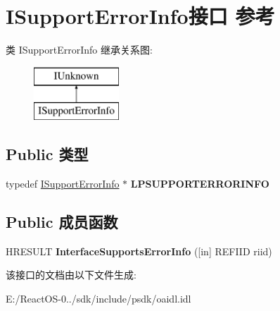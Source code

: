 \hypertarget{interface_i_support_error_info}{}\section{I\+Support\+Error\+Info接口 参考}
\label{interface_i_support_error_info}
类 I\+Support\+Error\+Info 继承关系图\+:\begin{figure}[H]
\begin{center}
\leavevmode
\includegraphics[height=2.000000cm]{interface_i_support_error_info}
\end{center}
\end{figure}
\subsection*{Public 类型}
\begin{DoxyCompactItemize}
\item 
\mbox{\label{interface_i_support_error_info_a7fab0bc24b55df6852c6f074d26496f3}} 
typedef \hyperlink{interface_i_support_error_info}{I\+Support\+Error\+Info} $\ast$ {\bfseries L\+P\+S\+U\+P\+P\+O\+R\+T\+E\+R\+R\+O\+R\+I\+N\+FO}
\end{DoxyCompactItemize}
\subsection*{Public 成员函数}
\begin{DoxyCompactItemize}
\item 
\mbox{\label{interface_i_support_error_info_aca1846f6cc7af9dde61088544cedcea8}} 
H\+R\+E\+S\+U\+LT {\bfseries Interface\+Supports\+Error\+Info} (\mbox{[}in\mbox{]} R\+E\+F\+I\+ID riid)
\end{DoxyCompactItemize}


该接口的文档由以下文件生成\+:\begin{DoxyCompactItemize}
\item 
E\+:/\+React\+O\+S-\/0../sdk/include/psdk/oaidl.\+idl\end{DoxyCompactItemize}
